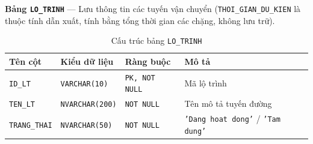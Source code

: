 \documentclass[11pt]{report}
\begin{document}
\noindent\textbf{Bảng \texttt{LO\_TRINH}} --- Lưu thông tin các tuyến vận chuyển (\texttt{THOI\_GIAN\_DU\_KIEN} là thuộc tính dẫn xuất, tính bằng tổng thời gian các chặng, không lưu trữ).
\begin{table}[H]
    \centering
    \renewcommand{\tabularxcolumn}[1]{m{#1}}
    \begin{tabularx}{\textwidth}{|l|l|l|X|} \hline
        \rowcolor{teal!30}
        \textbf{Tên cột} & \textbf{Kiểu dữ liệu} & \textbf{Ràng buộc} & \textbf{Mô tả} \\ \hline
        \texttt{ID\_LT}      & \texttt{VARCHAR(10)}   & \texttt{PK, NOT NULL}  & Mã lộ trình \\ \hline
        \texttt{TEN\_LT}     & \texttt{NVARCHAR(200)} & \texttt{NOT NULL}      & Tên mô tả tuyến đường \\ \hline
        \texttt{TRANG\_THAI} & \texttt{NVARCHAR(50)}  & \texttt{NOT NULL}      & \texttt{'Dang hoat dong'} / \texttt{'Tam dung'} \\ \hline
    \end{tabularx}
    \caption{Cấu trúc bảng \texttt{LO\_TRINH}}
    \label{tab:str_lotrinh}
\end{table}
\end{document}
